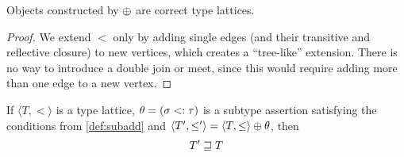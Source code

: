 \documentclass[main.tex]{subfiles}
\begin{document}
\begin{property}
    Objects constructed by $\oplus$ are correct type lattices.
\end{property}
\begin{proof}
    We extend $\less$ only by adding single edges (and their transitive and
    reflective closure) to new vertices, which creates a ``tree-like'' extension.
    There is no way to introduce a double join or meet, since this would
    require adding more than one edge to a new vertex.
\end{proof}

\begin{lemma}
    \label{lemma:subadd:rel}
    If $\langle T, \less \rangle$ is a type lattice, $\theta = (\sigma <: \tau)$
    is a subtype assertion satisfying the conditions from \cref{def:subadd}
    and $\langle T', \leq' \rangle = \langle T, \leq \rangle \oplus \theta$, then
    \[ T' \sqsupseteq T \]
\end{lemma}
\end{document}
